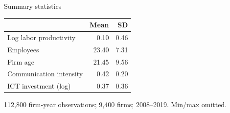 \documentclass[11pt, aspectratio=169]{beamer}
\begin{document}
\AppendixStart

\begin{frame}{Summary statistics}
  \hypertarget{app:sumstats}{}%
  \vspace{0.6em}
  \centering
  \begin{threeparttable}
    \begin{tabular}{lrr}
      \toprule
      & Mean & SD \\ \midrule
      Log labor productivity  & 0.10  & 0.46 \\  %
      Employees               & 23.40 & 7.31 \\
      Firm age                & 21.45 & 9.56 \\
      Communication intensity & 0.42  & 0.20 \\
      ICT investment (log)    & 0.37  & 0.36 \\
      \bottomrule
    \end{tabular}
    \begin{tablenotes}\footnotesize
      \item 112{,}800 firm-year observations; 9{,}400 firms; 2008--2019. Min/max omitted.
    \end{tablenotes}
  \end{threeparttable}
\end{frame}
\end{document}
